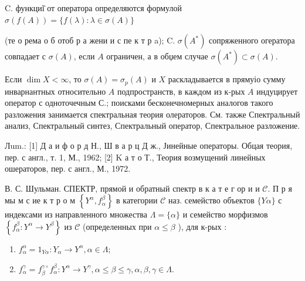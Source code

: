 \documentclass[10pt]{article}
\begin{document}
C. функциї̈ от оператора определяются формулой $\sigma(f(A))=\{f(\lambda): \lambda \in \sigma(A)\}$



(те о рема о б отоб р а жени и с пе к т р a); C. $\sigma\left(A^{*}\right)$ сопряженного огератора совпадает с $\sigma(A)$, если $A$ ограничен, а в обџем случае $\sigma\left(A^{*}\right) \subset \sigma(A)$.



Если $\operatorname{dim} X<\infty$, то $\sigma(A)=\sigma_{p}(A)$ и $X$ раскладывается в прямуіо сумму инварнантных относительно $A$ подпространств, в каждом из к-рых $A$ индуцирует оператор с одноточечным С.; поисками бесконечномерных аналогов такого разложения занимается спектральная теория олераторов. См. также Спектральный анализ, Спектральный синтез, Спектральный оператор, Спектральное разложение.



Лum.: [1] Д а и ф о р д Н., Ш в а р ц Д ж., Јинейные операторы. Обцая теория, пер. с англ., т. 1, М., 1962; [2] K а т о Т., Теория возмущений линейных ошераторов, пер. с англ., М., 1972.



В. С. Шульман. СПЕКТР, прямой и обратный спектр в к а т е г ор и и $\mathscr{C}$. П р я мы м с ие к т р о м $\left\{Y^{\alpha}, f_{\alpha}^{\beta}\right\}$ в категории $\mathscr{C}$ наз. семейство объектов $\{Y \alpha\}$ с индексами из направленного множества $\Lambda=\{\alpha\}$ и семейство морфизмов $\left\{f_{\alpha}^{\beta}: Y^{\alpha} \rightarrow Y^{\beta}\right\}$ из $\mathscr{C}$ (определенных при $\alpha \leqslant \beta$ ), для к-рых :



\begin{enumerate}

  \item $f_{\alpha}^{\alpha}=1_{Y \alpha}: Y_{\alpha} \rightarrow Y^{\alpha}, \alpha \in \Lambda$;



  \item $f_{\alpha}^{\gamma}=f_{\beta}^{\gamma \circ} f_{\alpha}^{\beta}: Y^{\alpha} \rightarrow Y^{\gamma}, \alpha \leqslant \beta \leqslant \gamma, \alpha, \beta, \gamma \in \Lambda$.



\end{enumerate}
\end{document}

